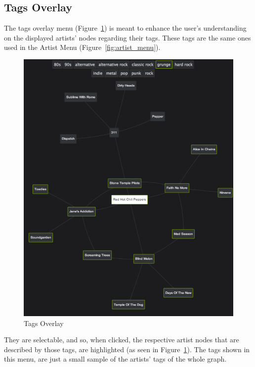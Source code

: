 \documentclass{article}
\begin{document}
    \subsection{Tags Overlay} 
    \label{sub:tags_overlay}
    
      The tags overlay menu (Figure~\ref{fig:tags_overlay}) is meant to enhance the user’s understanding on the displayed artists’ nodes regarding their tags. These tags are the same ones used in the Artist Menu (Figure~\ref{fig:artist_menu}).
      \begin{figure}[th]
        \begin{center}
          \includegraphics[width=\columnwidth]{../report/figures/tags_overlay.pdf}
        \end{center}
        \caption{Tags Overlay}
        \label{fig:tags_overlay}
      \end{figure}
      They are selectable, and so, when clicked, the respective artist nodes that are described by those tags, are highlighted (as seen in Figure~\ref{fig:tags_overlay}).
      The tags shown in this menu, are just a small sample of the artists’ tags of the whole graph.


% 

\end{document}
